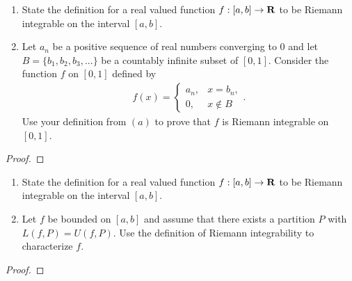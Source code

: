 \documentclass[11pt,twoside,openany]{memoir}
\begin{document}
\newpage
\fancyhead[L]{\scalebox{0.9}{Integration}}
\fancyhead[R]{\scalebox{0.9}{Appeared on: F19}}
\begin{problem}
    \phantom{a}
    \begin{enumerate}[label = (\arabic*)]
        \item State the definition for a real valued function $f:[a,b] \rightarrow \mathbf{R}$ to be Riemann integrable on the interval $[a,b]$.
        \item Let $a_n$ be a positive sequence of real numbers converging to $0$ and let $B = \{b_1,b_2,b_3,...\}$ be a countably infinite subset of $[0,1]$. Consider the function $f$ on $[0,1]$ defined by 
            \begin{equation*}
            \begin{split}
                f(x) = 
                \begin{cases}
                    a_n, & x = b_n, \\
                    0, & x \not\in B
                \end{cases}.
            \end{split}
            \end{equation*}
        Use your definition from $(a)$ to prove that $f$ is Riemann integrable on $[0,1]$.
    \end{enumerate}
\end{problem}
\begin{proof}
\end{proof}

\newpage
\fancyhead[L]{\scalebox{0.9}{Integration}}
\fancyhead[R]{\scalebox{0.9}{Appeared on: W19}}
\begin{problem}
    \phantom{a}
    \begin{enumerate}[label = (\arabic*)]
        \item State the definition for a real valued function $f:[a,b] \rightarrow \mathbf{R}$ to be Riemann integrable on the interval $[a,b]$.
        \item Let $f$ be bounded on $[a,b]$ and assume that there exists a partition $P$ with $L(f,P) = U(f,P)$. Use the definition of Riemann integrability to characterize $f$.
    \end{enumerate}
\end{problem}
\begin{proof}
\end{proof}
\end{document}
